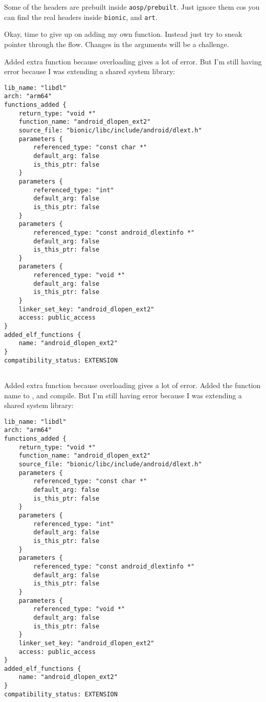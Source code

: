 Some of the headers are prebuilt inside \texttt{aosp/prebuilt}. Just ignore them cos you can find the real headers inside \texttt{bionic}, and \texttt{art}.

Okay, time to give up on adding my own function. Instead just try to sneak pointer through the flow. Changes in the arguments will be a challenge.

Added extra function because overloading gives a lot of error. But I'm still having error because I was extending a shared system library:
\begin{lstlisting}
lib_name: "libdl"
arch: "arm64"
functions_added {
    return_type: "void *"
    function_name: "android_dlopen_ext2"
    source_file: "bionic/libc/include/android/dlext.h"
    parameters {
        referenced_type: "const char *"
        default_arg: false
        is_this_ptr: false
    }
    parameters {
        referenced_type: "int"
        default_arg: false
        is_this_ptr: false
    }
    parameters {
        referenced_type: "const android_dlextinfo *"
        default_arg: false
        is_this_ptr: false
    }
    parameters {
        referenced_type: "void *"
        default_arg: false
        is_this_ptr: false
    }
    linker_set_key: "android_dlopen_ext2"
    access: public_access
}
added_elf_functions {
    name: "android_dlopen_ext2"
}
compatibility_status: EXTENSION
    
\end{lstlisting}

Added extra function because overloading gives a lot of error. Added the function name to , and compile. But I'm still having error because I was extending a shared system library:
\begin{lstlisting}
lib_name: "libdl"
arch: "arm64"
functions_added {
    return_type: "void *"
    function_name: "android_dlopen_ext2"
    source_file: "bionic/libc/include/android/dlext.h"
    parameters {
        referenced_type: "const char *"
        default_arg: false
        is_this_ptr: false
    }
    parameters {
        referenced_type: "int"
        default_arg: false
        is_this_ptr: false
    }
    parameters {
        referenced_type: "const android_dlextinfo *"
        default_arg: false
        is_this_ptr: false
    }
    parameters {
        referenced_type: "void *"
        default_arg: false
        is_this_ptr: false
    }
    linker_set_key: "android_dlopen_ext2"
    access: public_access
}
added_elf_functions {
    name: "android_dlopen_ext2"
}
compatibility_status: EXTENSION
    
\end{lstlisting}

